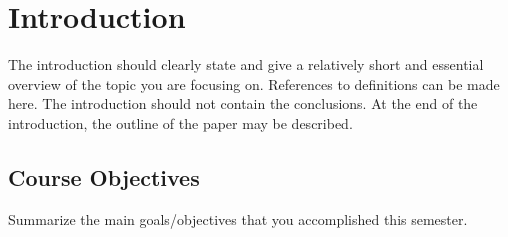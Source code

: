 \section{Introduction}

The introduction should clearly state and give a relatively short and essential overview of the topic you are focusing on. References to definitions can be made here.
The introduction should not contain the conclusions. At the end of the introduction, the outline of the paper may be described.


\subsection{Course Objectives}

Summarize the main goals/objectives that you accomplished this semester.